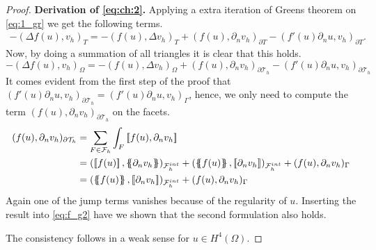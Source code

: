 \begin{proof}
         \textbf{Derivation of \eqref{eq:ch:2}.  }  Applying a extra iteration of Greens theorem on \eqref{eq:1_gr} we get the following terms.
\[
    \begin{split}
-(\Delta f( u) , v_{h})_{T }  = -( f( u), \Delta v_{h} )_{T} + (f( u), \partial _{n} v_{h}  )_{\partial T} - (   f'( u)\partial _{n}u, v_{h} )_{\partial T } .
    \end{split}
\]
Now, by doing a summation of all triangles it is clear that this holds.
\begin{equation}
\label{eq:f_g2}
-(\Delta f( u) , v_{h})_{\Omega  }  = -( f( u), \Delta v_{h} )_{\Omega } + (f( u), \partial _{n} v_{h}  )_{\partial \mathcal{T}_{h} } - (   f'( u)\partial _{n}u, v_{h} )_{\partial \mathcal{T}_{h}  }
\end{equation}
It comes evident from the first step of the proof that $ (   f'( u)\partial _{n}u, v_{h} )_{\partial \mathcal{T}_{h}  } = (   f'( u)\partial _{n}u, v_{h} )_{\Gamma }$, hence, we only need to compute the term $(f( u), \partial _{n} v_{h}  )_{\partial
\mathcal{T}_{h} }$ on the facets. \[
    \begin{split}
(f( u), \partial _{n} v_{h}  )_{\partial
\mathcal{T}_{h} } & = \sum_{F\in \mathcal{F} _{h}}^{} \int_{F}^{}\jump{ f( u), \partial _{n} v_{h}  } \\
& =  (\jump{ f( u)  }  , \mean{ \partial _{n} v_{h} }    )_{ \mathcal{F}_{h}^{int} } +(\mean{ f( u)  }  , \jump{ \partial _{n} v_{h} }    )_{ \mathcal{F}_{h}^{int} } + (f( u), \partial _{n} v_{h}  )_{\Gamma } \\
&=  (\mean{ f( u)  }  , \jump{ \partial _{n} v_{h} }    )_{ \mathcal{F}_{h}^{int} } + (f( u), \partial _{n} v_{h}  )_{\Gamma }
    \end{split}
\]
Again one of the jump terms vanishes because of the regularity of $u$.
Inserting the result into \eqref{eq:f_g2} have we shown that the second formulation also holds.

The consistency follows in a weak sense for $u \in H^{4}( \Omega ) $.
\end{proof}

